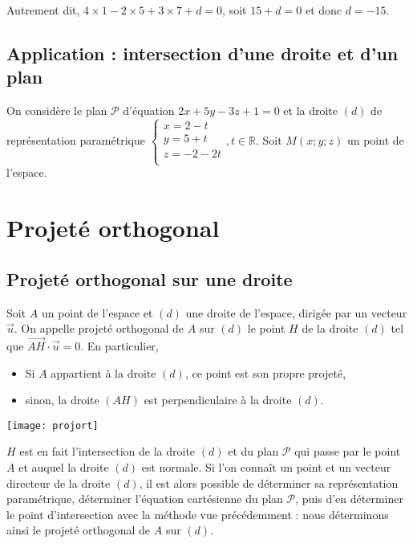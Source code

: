 \documentclass[11pt,fleqn, openany]{book} %
\begin{document}
Autrement dit, $4 \times 1 -2 \times 5 + 3 \times 7 + d =0$, soit $15+d=0$ et donc $d=-15$.





\subsection{Application : intersection d'une droite et d'un plan}



\begin{example}On considère le plan $\mathcal{P}$ d'équation $2x+5y-3z+1=0$ et la droite $(d)$ de représentation paramétrique  $\left\{ \begin{array}{l}x=2-t \\ y=5+t \\ z = -2-2t \\\end{array}\right., t \in \mathbb{R}$. Soit $M(x;y;z)$ un point de l'espace.

\vskip200pt \end{example}
\newpage


\section{Projeté orthogonal}

\subsection{Projeté orthogonal sur une droite}

\begin{definition}Soit $A$ un point de l'espace et $(d)$ une droite de l'espace, dirigée par un vecteur $\vec u$.
On appelle projeté orthogonal de $A$ sur $(d)$ le point $H$ de la droite $(d)$ tel que $\overrightarrow{AH} \cdot \vec{u}=0$. En particulier,
\begin{itemize}
\item Si $A$ appartient à la droite $(d)$, ce point est son propre projeté,
\item sinon, la droite $(AH)$ est perpendiculaire à la droite $(d)$.
\end{itemize}\end{definition}

\begin{center}
\texttt{[image: projort]}
\end{center}

$H$ est en fait l'intersection de la droite $(d)$ et du plan $\mathcal{P}$ qui passe par le point $A$ et auquel la droite $(d)$ est normale. Si l'on connaît un point et un vecteur directeur de la droite $(d)$, il est alors possible de déterminer sa représentation paramétrique, déterminer l'équation cartésienne du plan $\mathcal{P}$, puis d'en déterminer le point d'intersection avec la méthode vue précédemment : nous déterminons ainsi le projeté orthogonal de $A$ sur $(d)$.
\end{document}
